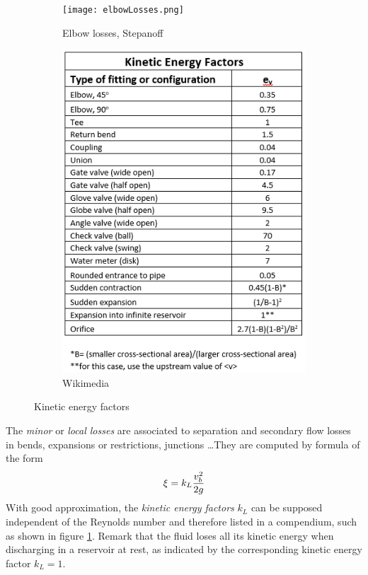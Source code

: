 \begin{figure}[!h]
  \begin{subfigure}{0.65\textwidth}
    \texttt{[image: elbowLosses.png]}
    \caption{Elbow losses, Stepanoff \cite{Stepanoff}}
  \end{subfigure}
  \begin{subfigure}{0.35\textwidth}
    \includegraphics[width=\textwidth]{hydrodynamics/KineticEnergyFactors.png}
    \caption{Wikimedia}
  \end{subfigure}
  \caption{Kinetic energy factors}
  \label{fig:kineticEnergyFactors}
\end{figure}
The \emph{minor} or \emph{local losses} are associated to separation
and secondary flow losses in bends, expansions or restrictions,
junctions \ldots They are computed by formula of the form
\begin{equation}
  \xi = k_L \frac{v_b^2}{2g}
\end{equation}
With good approximation, the \emph{kinetic energy factors} $k_L$ can
be supposed independent of the Reynolds number and therefore listed in
a compendium, such as shown in figure
\ref{fig:kineticEnergyFactors}. Remark that the fluid loses all its
kinetic energy when discharging in a reservoir at rest, as indicated
by the corresponding kinetic energy factor $k_L=1$.

